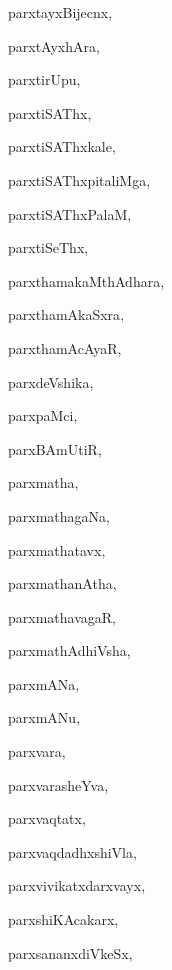 \begin{multicols}{3}
{\noindent
{parxtayxBijecnx}, \pageref{parxtayxBijecnx}

\noindent
{parxtAyxhAra}, \pageref{parxtAyxhAra}

\noindent
{parxtirUpu}, \pageref{parxtirUpu}

\noindent
{parxtiSAThx}, \pageref{parxtiSAThx}

\noindent
{parxtiSAThxkale}, \pageref{parxtiSAThxkale}

\noindent
{parxtiSAThxpitaliMga}, \pageref{parxtiSAThxpitaliMga}

\noindent
{parxtiSAThxPalaM}, \pageref{parxtiSAThxPalaM}

\noindent
{parxtiSeThx}, \pageref{parxtiSeThx}

\noindent
{parxthamakaMthAdhara}, \pageref{parxthamakaMthAdhara}

\noindent
{parxthamAkaSxra}, \pageref{parxthamAkaSxra}

\noindent
{parxthamAcAyaR}, \pageref{parxthamAcAyaR}

\noindent
{parxdeVshika}, \pageref{parxdeVshika}

\noindent
{parxpaMci}, \pageref{parxpaMci}

\noindent
{parxBAmUtiR}, \pageref{parxBAmUtiR}

\noindent
{parxmatha}, \pageref{parxmatha}

\noindent
{parxmathagaNa}, \pageref{parxmathagaNa}

\noindent
{parxmathatavx}, \pageref{parxmathatavx}

\noindent
{parxmathanAtha}, \pageref{parxmathanAtha}

\noindent
{parxmathavagaR}, \pageref{parxmathavagaR}

\noindent
{parxmathAdhiVsha}, \pageref{parxmathAdhiVsha}

\noindent
{parxmANa}, \pageref{parxmANa}

\noindent
{parxmANu}, \pageref{parxmANu}

\noindent
{parxvara}, \pageref{parxvara}

\noindent
{parxvarasheYva}, \pageref{parxvarasheYva}

\noindent
{parxvaqtatx}, \pageref{parxvaqtatx}

\noindent
{parxvaqdadhxshiVla}, \pageref{parxvaqdadhxshiVla}

\noindent
{parxvivikatxdarxvayx}, \pageref{parxvivikatxdarxvayx}

\noindent
{parxshiKAcakarx}, \pageref{parxshiKAcakarx}

\noindent
{parxsananxdiVkeSx}, \pageref{parxsananxdiVkeSx}

}
\end{multicols}
